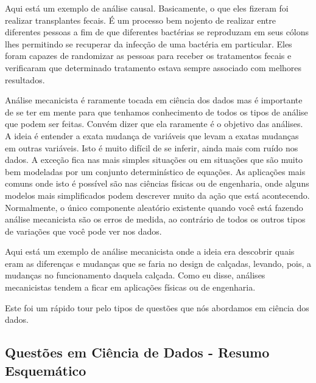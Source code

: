 \begin{multicols}{2}
\begin{footnotesize}
Aqui está um exemplo de análise causal. Basicamente, o que eles fizeram foi realizar transplantes fecais. É um processo bem nojento de realizar entre diferentes pessoas a fim de que diferentes bactérias se reproduzam em seus cólons lhes permitindo se recuperar da infecção de uma bactéria em particular. Eles foram capazes de randomizar as pessoas para receber os tratamentos fecais e verificaram que determinado tratamento estava sempre associado com melhores resultados.

Análise mecanicista é raramente tocada em ciência dos dados mas é importante de se ter em mente para que tenhamos conhecimento de todos os tipos de análise que podem ser feitas. Convém dizer que ela raramente é o objetivo das análises. A ideia é entender a exata mudança de variáveis que levam a exatas mudanças em outras variáveis. Isto é muito difícil de se inferir, ainda mais com ruído nos dados. A exceção fica nas mais simples situações ou em situações que são muito bem modeladas por um conjunto determinístico de equações. As aplicações mais comuns onde isto é possível são nas ciências físicas ou de engenharia, onde alguns modelos mais simplificados podem descrever muito da ação que está acontecendo.
Normalmente, o único componente aleatório existente quando você está fazendo análise mecanicista são os erros de medida, ao contrário de todos os outros tipos de variações que você pode ver nos dados.

Aqui está um exemplo de análise mecanicista onde a ideia era descobrir quais eram as diferenças e mudanças que se faria no design de calçadas, levando, pois, a mudanças no funcionamento daquela calçada. Como eu disse, análises mecanicistas tendem a ficar em aplicações físicas ou de engenharia.

Este foi um rápido tour pelo tipos de questões que nós abordamos em ciência dos dados.
\end{footnotesize}
\end{multicols}


\subsection*{Questões em Ciência de Dados - Resumo Esquemático}

